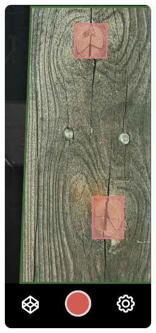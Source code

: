 \renewcommand\thesection{\arabic{section}}
\renewcommand\thesubsection{\thesection.\arabic{subsection}}

\begin{figure}[ht]
    \begin{subfigure}[b]{0.3\textwidth}
        \includegraphics[width=0.7\textwidth]{Master Thesis/Images/Section_3/Mock/3-Mock3.png}
    \end{subfigure}
     \hfill
    \begin{subfigure}[b]{0.3\textwidth}

\end{subfigure}
\end{figure}

